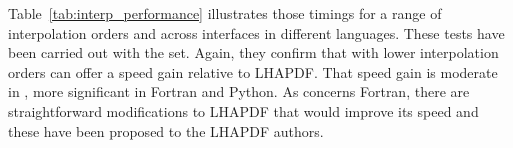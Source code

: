Table~\ref{tab:interp_performance} illustrates those timings for a range of
interpolation orders and across interfaces in different languages.
%
These tests have been carried out with the  set.
%
Again, they confirm that \hoppet with lower interpolation orders
can offer a speed gain relative to LHAPDF.
%
That speed gain is moderate in \CPP, more significant in Fortran and
Python.
%
As concerns Fortran, there are straightforward modifications to LHAPDF
that would improve its speed and these have been proposed to the
LHAPDF authors.






